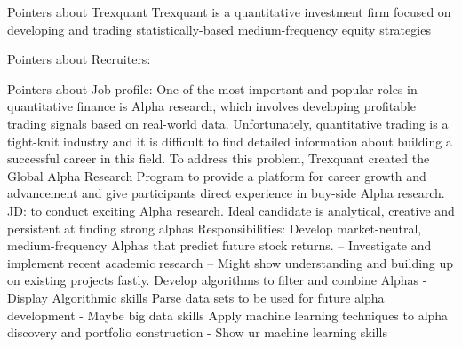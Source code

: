Pointers about Trexquant
Trexquant is a quantitative investment firm focused on developing and trading statistically-based medium-frequency equity strategies


Pointers about Recruiters: 

Pointers about Job profile: 
One of the most important and popular roles in quantitative finance is Alpha research, which involves developing profitable trading signals based on real-world data.
Unfortunately, quantitative trading is a tight-knit industry and it is difficult to find detailed information about building a successful career in this field.  To address this problem, Trexquant created the Global Alpha Research Program to provide a platform for career growth and advancement and give participants direct experience in buy-side Alpha research.
JD: 
to conduct exciting Alpha research.
Ideal candidate is analytical, creative and persistent at finding strong alphas
Responsibilities: 
Develop market-neutral, medium-frequency Alphas that predict future stock returns. -- 
Investigate and implement recent academic research -- Might show understanding and building up on existing projects fastly. 
Develop algorithms to filter and combine Alphas - Display Algorithmic skills
Parse data sets to be used for future alpha development - Maybe big data skills
Apply machine learning techniques to alpha discovery and portfolio construction - Show ur machine learning skills
